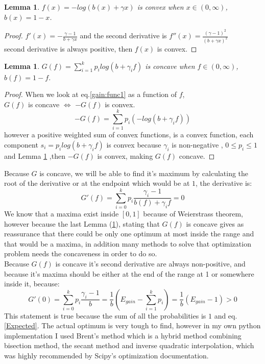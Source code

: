 \documentclass{article}
\newtheorem{lem}[thm]{Lemma}
\begin{document}
	\newline \newline
	\begin{lem}\label{thm1}
		$f(x) = -log(b(x)+\gamma x)$ is convex when $x\in (0,\infty)$, $b(x) = 1-x$.
	\end{lem}
	\begin{proof}
		$f'(x) = -\frac{\gamma - 1}{b+\gamma x}$ and the second derivative is 
		$f''(x) = \frac{(\gamma -1) ^2}{(b+\gamma x)^2}$\\
		second derivative is always positive, then $f(x)$ is convex.
		\newline
	\end{proof}	
	\begin{lem}
		\label{lem1}
		\(G(f) = \sum_{i=1}^{k} p_i log(b+\gamma_i f)\) is concave when $f\in (0,\infty)$, \\$b(f) = 1-f$.
	\end{lem}
	\begin{proof}
		When we look at eq.\ref{gain:func1} as a function of $f$,\\
		$G(f)$ is concave $\iff$ $-G(f)$ is convex.
		\[-G(f) = \sum_{i=1}^{k} p_i (-log(b+\gamma_i f))\]
		however a positive weighted sum of convex functions, is a convex function, each component $s_i = p_i log(b+\gamma_i f)$ is convex because $\gamma _i$ is non-negative , $0\le p_i \le 1$ and Lemma \ref{thm1} ,then \(-G(f)\) is convex, making $G(f)$ concave.
		\newline
	\end{proof}

	Because $G$ is concave, we will be able to find it's maximum by calculating the root of the derivative or at the endpoint which would be at $1$, the derivative is: 
	\[G'(f) = \sum_{i=0}^{k} p_i \frac{\gamma_i - 1}{b(f)+\gamma_i f} = 0\] 
	We know that a maxima exist inside $[0,1]$ because of Weierstrass theorem, however because the last Lemma (\ref{lem1}), stating that $G(f)$ is concave gives as reassurance that there could be only one optimum at most inside the range and that would be a maxima, in addition many methods to solve that optimization problem needs the concaveness in order to do so. \\
	Because $G(f)$ is concave it's second derivative are always non-positive, and because it's maxima should be either at the end of the range at 1 or somewhere inside it, because:
	 \[G'(0) = \sum_{i=0}^{k} p_i \frac{\gamma_i - 1}{b} = \frac{1}{b}(E_{gain} - \sum_{i = 1}^{k} p_i) = \frac{1}{b}(E_{gain} - 1) > 0\]
	This statement is true because the sum of all the probabilities is $1$ and eq.\ref{Expected}.
	\newline
	The actual optimum is very tough to find, however in my own python implementation I used Brent's method \cite{Scipy-brent} which is a hybrid method combining bisection method, the secant method and inverse quadratic interpolation, which was highly recommended by Scipy's optimization documentation.
	
\end{document}
